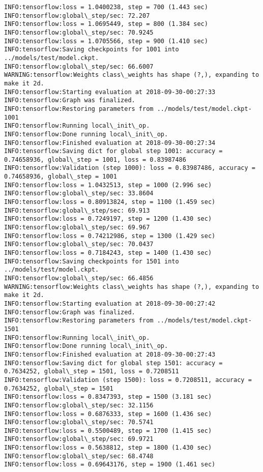 \documentclass[11pt]{article}
\begin{document}
\begin{Verbatim}[commandchars=\\\{\}]
INFO:tensorflow:loss = 1.0400238, step = 700 (1.443 sec)
INFO:tensorflow:global\_step/sec: 72.207
INFO:tensorflow:loss = 1.0695449, step = 800 (1.384 sec)
INFO:tensorflow:global\_step/sec: 70.9245
INFO:tensorflow:loss = 1.0705566, step = 900 (1.410 sec)
INFO:tensorflow:Saving checkpoints for 1001 into ../models/test/model.ckpt.
INFO:tensorflow:global\_step/sec: 66.6007
WARNING:tensorflow:Weights class\_weights has shape (?,), expanding to make it 2d.
INFO:tensorflow:Starting evaluation at 2018-09-30-00:27:33
INFO:tensorflow:Graph was finalized.
INFO:tensorflow:Restoring parameters from ../models/test/model.ckpt-1001
INFO:tensorflow:Running local\_init\_op.
INFO:tensorflow:Done running local\_init\_op.
INFO:tensorflow:Finished evaluation at 2018-09-30-00:27:34
INFO:tensorflow:Saving dict for global step 1001: accuracy = 0.74658936, global\_step = 1001, loss = 0.83987486
INFO:tensorflow:Validation (step 1000): loss = 0.83987486, accuracy = 0.74658936, global\_step = 1001
INFO:tensorflow:loss = 1.0432513, step = 1000 (2.996 sec)
INFO:tensorflow:global\_step/sec: 33.8604
INFO:tensorflow:loss = 0.80913824, step = 1100 (1.459 sec)
INFO:tensorflow:global\_step/sec: 69.913
INFO:tensorflow:loss = 0.7249197, step = 1200 (1.430 sec)
INFO:tensorflow:global\_step/sec: 69.967
INFO:tensorflow:loss = 0.74212986, step = 1300 (1.429 sec)
INFO:tensorflow:global\_step/sec: 70.0437
INFO:tensorflow:loss = 0.7184243, step = 1400 (1.430 sec)
INFO:tensorflow:Saving checkpoints for 1501 into ../models/test/model.ckpt.
INFO:tensorflow:global\_step/sec: 66.4856
WARNING:tensorflow:Weights class\_weights has shape (?,), expanding to make it 2d.
INFO:tensorflow:Starting evaluation at 2018-09-30-00:27:42
INFO:tensorflow:Graph was finalized.
INFO:tensorflow:Restoring parameters from ../models/test/model.ckpt-1501
INFO:tensorflow:Running local\_init\_op.
INFO:tensorflow:Done running local\_init\_op.
INFO:tensorflow:Finished evaluation at 2018-09-30-00:27:43
INFO:tensorflow:Saving dict for global step 1501: accuracy = 0.7634252, global\_step = 1501, loss = 0.7208511
INFO:tensorflow:Validation (step 1500): loss = 0.7208511, accuracy = 0.7634252, global\_step = 1501
INFO:tensorflow:loss = 0.8347393, step = 1500 (3.181 sec)
INFO:tensorflow:global\_step/sec: 32.1156
INFO:tensorflow:loss = 0.6876333, step = 1600 (1.436 sec)
INFO:tensorflow:global\_step/sec: 70.5741
INFO:tensorflow:loss = 0.5500489, step = 1700 (1.415 sec)
INFO:tensorflow:global\_step/sec: 69.9721
INFO:tensorflow:loss = 0.5638812, step = 1800 (1.430 sec)
INFO:tensorflow:global\_step/sec: 68.4748
INFO:tensorflow:loss = 0.69643176, step = 1900 (1.461 sec)

\end{Verbatim}
\end{document}
